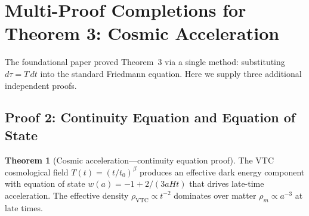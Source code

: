\documentclass[11pt,a4paper]{article}
\theoremstyle{definition}
\newtheorem{theorem}{Theorem}[section]
\newcommand{\VTC}{\mathrm{VTC}}
\begin{document}
\section{Multi-Proof Completions for Theorem 3: Cosmic Acceleration}
\label{sec:thm3_proofs}

The foundational paper proved Theorem~3 via a single method: substituting $d\tau = T\,dt$ into the standard Friedmann equation. Here we supply three additional independent proofs.

\subsection{Proof 2: Continuity Equation and Equation of State}
\label{sec:thm3_continuity}

\begin{theorem}[Cosmic acceleration---continuity equation proof]
The VTC cosmological field $T(t) = (t/t_0)^\beta$ produces an effective dark energy component with equation of state $w(a) = -1 + 2/(3aHt)$ that drives late-time acceleration. The effective density $\rho_{\VTC} \propto t^{-2}$ dominates over matter $\rho_m \propto a^{-3}$ at late times.
\end{theorem}
\end{document}
